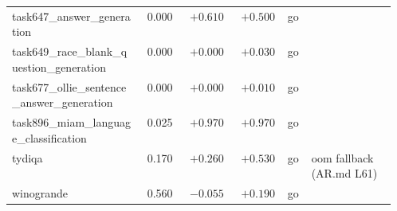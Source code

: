 \begin{longtable}{@{}p{0.34\linewidth}rrrcp{0.22\linewidth}@{}}
\scriptsize task647\_\hspace{0pt}answer\_\hspace{0pt}generation & \scriptsize 0.000 & \scriptsize $+0.610$ & \scriptsize $+0.500$ & \scriptsize go & \scriptsize  \\
\scriptsize task649\_\hspace{0pt}race\_\hspace{0pt}blank\_\hspace{0pt}question\_\hspace{0pt}generation & \scriptsize 0.000 & \scriptsize $+0.000$ & \scriptsize $+0.030$ & \scriptsize go & \scriptsize  \\
\scriptsize task677\_\hspace{0pt}ollie\_\hspace{0pt}sentence\_\hspace{0pt}answer\_\hspace{0pt}generation & \scriptsize 0.000 & \scriptsize $+0.000$ & \scriptsize $+0.010$ & \scriptsize go & \scriptsize  \\
\scriptsize task896\_\hspace{0pt}miam\_\hspace{0pt}language\_\hspace{0pt}classification & \scriptsize 0.025 & \scriptsize $+0.970$ & \scriptsize $+0.970$ & \scriptsize go & \scriptsize  \\
\scriptsize tydiqa & \scriptsize 0.170 & \scriptsize $+0.260$ & \scriptsize $+0.530$ & \scriptsize go & \scriptsize oom fallback (AR.md L61) \\
\scriptsize winogrande & \scriptsize 0.560 & \scriptsize $-0.055$ & \scriptsize $+0.190$ & \scriptsize go & \scriptsize  \\
\end{longtable}
